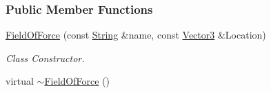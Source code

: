 \subsubsection*{Public Member Functions}
\begin{DoxyCompactItemize}
\item 
\hyperlink{classphys_1_1FieldOfForce_a0e9496af8a6c8cb0d79ebe40bbe223f2}{FieldOfForce} (const \hyperlink{namespacephys_aa03900411993de7fbfec4789bc1d392e}{String} \&name, const \hyperlink{classphys_1_1Vector3}{Vector3} \&Location)
\begin{DoxyCompactList}\small\item\em Class Constructor. \item\end{DoxyCompactList}\item 
\hypertarget{classphys_1_1FieldOfForce_a263efed38a423130a2b3271db6fcbb88}{
virtual \hyperlink{classphys_1_1FieldOfForce_a263efed38a423130a2b3271db6fcbb88}{$\sim$FieldOfForce} ()}
\label{classphys_1_1FieldOfForce_a263efed38a423130a2b3271db6fcbb88}


\end{DoxyCompactItemize}
